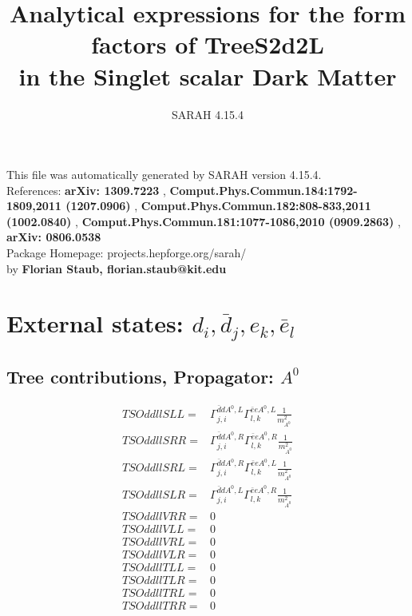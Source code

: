 \documentclass[A4,landscape]{article}
\begin{document}
\title{Analytical expressions for the form factors of TreeS2d2L\\ in the Singlet scalar Dark Matter } 
 \author{SARAH 4.15.4} 
 \maketitle 
 \vspace{10cm} 
This file was automatically generated by SARAH version 4.15.4.  \\ 
References: {\bf arXiv: 1309.7223 }, {\bf Comput.Phys.Commun.184:1792-1809,2011 (1207.0906) }, {\bf Comput.Phys.Commun.182:808-833,2011 (1002.0840) }, {\bf Comput.Phys.Commun.181:1077-1086,2010 (0909.2863) }, {\bf arXiv: 0806.0538 } \\ 
Package Homepage: projects.hepforge.org/sarah/ \\ 
by {\bf Florian Staub, florian.staub@kit.edu} 
 \pagebreak 
 \tableofcontents 
 \pagebreak 
\section{External states: ${d_{{i}}, \bar{d}_{{j}}, e_{{k}}, \bar{e}_{{l}}}$} 
\subsection{Tree contributions, Propagator: $A^0$} 

\begin{align} 
  TSOddllSLL= & \Gamma^{\bar{d}d A^0 ,L}_{j, i} \Gamma^{\bar{e}e A^0 ,L}_{l, k} \frac{1}{m^2_{A^0}} \\ 
  TSOddllSRR= & \Gamma^{\bar{d}d A^0 ,R}_{j, i} \Gamma^{\bar{e}e A^0 ,R}_{l, k} \frac{1}{m^2_{A^0}} \\ 
  TSOddllSRL= & \Gamma^{\bar{d}d A^0 ,R}_{j, i} \Gamma^{\bar{e}e A^0 ,L}_{l, k} \frac{1}{m^2_{A^0}} \\ 
  TSOddllSLR= & \Gamma^{\bar{d}d A^0 ,L}_{j, i} \Gamma^{\bar{e}e A^0 ,R}_{l, k} \frac{1}{m^2_{A^0}} \\ 
  TSOddllVRR= & 0 \\ 
  TSOddllVLL= & 0 \\ 
  TSOddllVRL= & 0 \\ 
  TSOddllVLR= & 0 \\ 
  TSOddllTLL= & 0 \\ 
  TSOddllTLR= & 0 \\ 
  TSOddllTRL= & 0 \\ 
  TSOddllTRR= & 0 \\ 
\end{align} 
\end{document}
